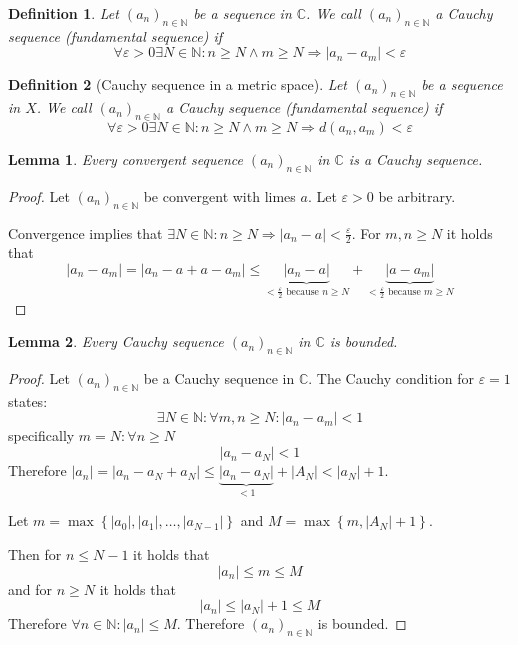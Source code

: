 \documentclass[a4paper,landscape,twocolumn]{article}
\newtheorem{defi}{Definition}
\newtheorem{lemma}{Lemma}
\newcommand\set[1]{\left\{#1\right\}}
\newcommand\abs[1]{\left|#1\right|}
\newcommand\seq[1]{{\left(#1\right)}_{n \in \mathbb N}}
\begin{document}
\begin{defi}
  Let $\seq{a_n}$ be a sequence in $\mathbb C$.
  We call $\seq{a_n}$ a \emph{Cauchy sequence} (fundamental sequence) if
  \[ \forall \varepsilon > 0 \exists N \in \mathbb N: n \geq N \land m \geq N \Rightarrow \abs{a_n - a_m} < \varepsilon \]
\end{defi}
\begin{defi}[Cauchy sequence in a metric space]
  Let $\seq{a_n}$ be a sequence in $X$.
  We call $\seq{a_n}$ a \emph{Cauchy sequence} (fundamental sequence) if
  \[ \forall \varepsilon > 0 \exists N \in \mathbb N: n \geq N \land m \geq N \Rightarrow d(a_n, a_m) < \varepsilon \]
\end{defi}

\begin{lemma}
  Every convergent sequence $\seq{a_n}$ in $\mathbb C$ is a Cauchy sequence.
\end{lemma}
\begin{proof}
  Let $\seq{a_n}$ be convergent with limes $a$.
  Let $\varepsilon > 0$ be arbitrary.

  Convergence implies that $\exists N \in \mathbb N: n \geq N \Rightarrow \abs{a_n - a} < \frac\varepsilon2$.
  For $m,n \geq N$ it holds that
  \[
      \abs{a_n - a_m}
      = \abs{a_n - a + a - a_m}
      \leq \underbrace{\abs{a_n - a}}_{< \frac\varepsilon2 \text{ because } n \geq N} + \underbrace{\abs{a - a_m}}_{< \frac\varepsilon2 \text{ because } m \geq N}
  \]
\end{proof}

\begin{lemma}
  Every Cauchy sequence $\seq{a_n}$ in $\mathbb C$ is bounded.
\end{lemma}
\begin{proof}
  Let $\seq{a_n}$ be a Cauchy sequence in $\mathbb C$.
  The Cauchy condition for $\varepsilon = 1$ states:
  \[ \exists N \in \mathbb N: \forall m,n \geq N: \abs{a_n - a_m} < 1 \]
  specifically $m = N: \forall n \geq N$
  \[ \abs{a_n - a_N} < 1 \]
  Therefore $\abs{a_n} = \abs{a_n - a_N + a_N} \leq \underbrace{\abs{a_n - a_N}}_{<1} + \abs{A_N} < \abs{a_N} + 1$.

  Let $m = \max\set{\abs{a_0}, \abs{a_1}, \dots, \abs{a_{N-1}}}$
  and $M = \max\set{m, \abs{A_N} + 1}$.

  Then for $n \leq N - 1$ it holds that
  \[ \abs{a_n} \leq m \leq M \]
  and for $n \geq N$ it holds that
  \[ \abs{a_n} \leq \abs{a_N} + 1 \leq M \]
  Therefore $\forall n \in \mathbb N: \abs{a_n} \leq M$.
  Therefore $\seq{a_n}$ is bounded.
\end{proof}
\end{document}
